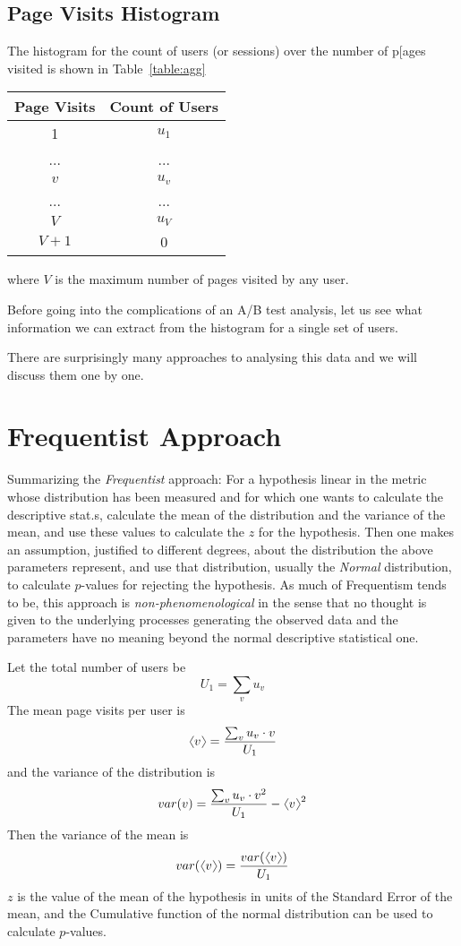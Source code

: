 \documentclass[12pt]{report}
\newcommand{\bdm}{\begin{displaymath}} %
\newcommand{\edm}{\end{displaymath}} %
\newcommand{\langl}{\begin{picture}(4.5,7)
\put(1.1,2.5){\rotatebox{60}{\line(1,0){5.5}}}
\put(1.1,2.5){\rotatebox{300}{\line(1,0){5.5}}}
\end{picture}}
\newcommand{\rangl}{\begin{picture}(4.5,7)
\put(.9,2.5){\rotatebox{120}{\line(1,0){5.5}}}
\put(.9,2.5){\rotatebox{240}{\line(1,0){5.5}}}
\end{picture}}
\newcommand{\mymean}[1]{\ensuremath{\langl{#1}\rangl}} %
\begin{document}
\subsection{Page Visits Histogram}
The histogram for the count of users (or sessions) over the number of
p[ages visited is shown in Table~\ref{table:agg}
\begin{center}\label{table:agg}
\begin{tabular}{ |c|c| } 
 \hline
 Page Visits & Count of Users  \\
 \hline
 1 & \(u_1\) \\
 ... & ... \\ 
 \(v\) & \(u_v\) \\
 ... & ... \\
 \(V\) & \(u_V\) \\
 \(V+1\) & 0 \\
 \hline
\end{tabular}
\end{center}
where \(V\) is the maximum number of pages visited by any user.

Before going into the complications of an A/B test analysis, let us
see what information we can extract from the histogram for a single
set of users.

There are surprisingly many approaches to analysing this data and we
will discuss them one by one.

\section{Frequentist Approach}\label{sec:freq}
Summarizing the {\em Frequentist} approach: For a hypothesis linear in
the metric whose distribution has been measured and for which one
wants to calculate the descriptive stat.s, calculate the mean of the
distribution and the variance of the mean, and use these values to
calculate the \(z\) for the hypothesis. Then one makes an assumption,
justified to different degrees, about the distribution the above
parameters represent, and use that distribution, usually the {\em
  Normal} distribution, to calculate \(p\)-values for rejecting the
hypothesis. As much of Frequentism tends to be, this approach is {\em
  non-phenomenological} in the sense that no thought is given to the
underlying processes generating the observed data and the parameters
have no meaning beyond the normal descriptive statistical one.

Let the total number of users be
\bdm
U_1 = \sum_v u_v
\edm
The mean page visits per user is
\bdm
\mymean{v} = \frac{\sum_vu_v\cdot v}{U_1}
\edm and the variance of the distribution is
\bdm
var(v) = \frac{\sum_v u_v\cdot v^2}{U_1} -\mymean{v}^2
\edm
Then the variance of the mean is
\bdm
var(\mymean{v}) = \frac{var(\mymean{v})}{U_1}
\edm
\(z\) is the value of the mean of the hypothesis in
units of the Standard Error of the mean, and the Cumulative function
of the normal distribution can be used to calculate \(p\)-values.
\end{document}
